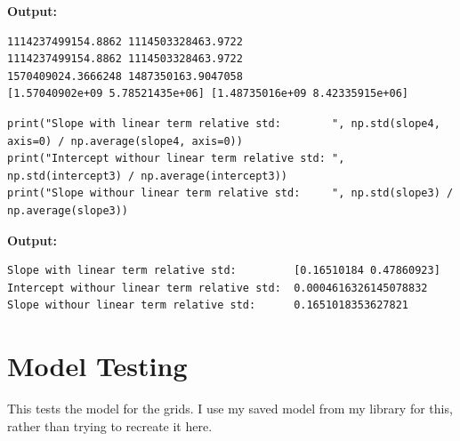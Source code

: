 \documentclass{article}
\begin{document}
\textbf{Output:}\begin{verbatim}
1114237499154.8862 1114503328463.9722
1114237499154.8862 1114503328463.9722
1570409024.3666248 1487350163.9047058
[1.57040902e+09 5.78521435e+06] [1.48735016e+09 8.42335915e+06]

\end{verbatim}

\begin{lstlisting}
print("Slope with linear term relative std:        ", np.std(slope4, axis=0) / np.average(slope4, axis=0))
print("Intercept withour linear term relative std: ", np.std(intercept3) / np.average(intercept3))
print("Slope withour linear term relative std:     ", np.std(slope3) / np.average(slope3))\end{lstlisting}

\textbf{Output:}\begin{verbatim}
Slope with linear term relative std:         [0.16510184 0.47860923]
Intercept withour linear term relative std:  0.0004616326145078832
Slope withour linear term relative std:      0.1651018353627821

\end{verbatim}

\section{Model Testing}

This tests the model for the grids. I use my saved model from my library for this, rather than trying to recreate it here. 
\end{document}
